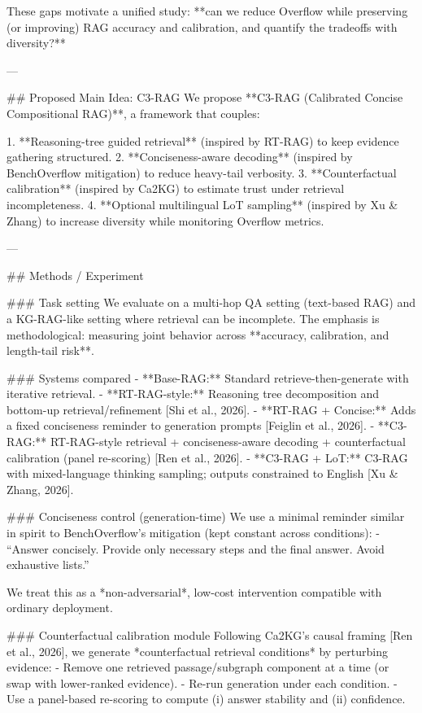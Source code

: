 These gaps motivate a unified study: **can we reduce Overflow while preserving (or improving) RAG accuracy and calibration, and quantify the tradeoffs with diversity?**

---

## Proposed Main Idea: C3-RAG  
We propose **C3-RAG (Calibrated Concise Compositional RAG)**, a framework that couples:

1. **Reasoning-tree guided retrieval** (inspired by RT-RAG) to keep evidence gathering structured.  
2. **Conciseness-aware decoding** (inspired by BenchOverflow mitigation) to reduce heavy-tail verbosity.  
3. **Counterfactual calibration** (inspired by Ca2KG) to estimate trust under retrieval incompleteness.  
4. **Optional multilingual LoT sampling** (inspired by Xu & Zhang) to increase diversity while monitoring Overflow metrics.

---

## Methods / Experiment  

### Task setting  
We evaluate on a multi-hop QA setting (text-based RAG) and a KG-RAG-like setting where retrieval can be incomplete. The emphasis is methodological: measuring joint behavior across **accuracy, calibration, and length-tail risk**.

### Systems compared  
- **Base-RAG:** Standard retrieve-then-generate with iterative retrieval.  
- **RT-RAG-style:** Reasoning tree decomposition and bottom-up retrieval/refinement [Shi et al., 2026].  
- **RT-RAG + Concise:** Adds a fixed conciseness reminder to generation prompts [Feiglin et al., 2026].  
- **C3-RAG:** RT-RAG-style retrieval + conciseness-aware decoding + counterfactual calibration (panel re-scoring) [Ren et al., 2026].  
- **C3-RAG + LoT:** C3-RAG with mixed-language thinking sampling; outputs constrained to English [Xu & Zhang, 2026].

### Conciseness control (generation-time)  
We use a minimal reminder similar in spirit to BenchOverflow’s mitigation (kept constant across conditions):  
- “Answer concisely. Provide only necessary steps and the final answer. Avoid exhaustive lists.”

We treat this as a *non-adversarial*, low-cost intervention compatible with ordinary deployment.

### Counterfactual calibration module  
Following Ca2KG’s causal framing [Ren et al., 2026], we generate *counterfactual retrieval conditions* by perturbing evidence:
- Remove one retrieved passage/subgraph component at a time (or swap with lower-ranked evidence).
- Re-run generation under each condition.
- Use a panel-based re-scoring to compute (i) answer stability and (ii) confidence.


